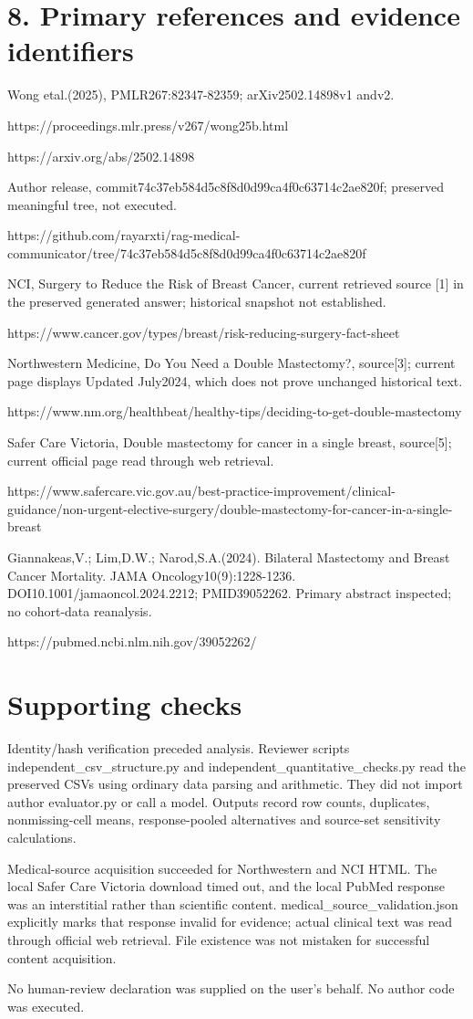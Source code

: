 \documentclass[10pt]{article}
\begin{document}
\section*{8. Primary references and evidence identifiers}
Wong etal.(2025), PMLR267:82347-82359; arXiv2502.14898v1 andv2.\par
https://proceedings.mlr.press/v267/wong25b.html\par
https://arxiv.org/abs/2502.14898\par
Author release, commit74c37eb584d5c8f8d0d99ca4f0c63714c2ae820f; preserved meaningful tree, not executed.\par
https://github.com/rayarxti/rag-medical-communicator/tree/74c37eb584d5c8f8d0d99ca4f0c63714c2ae820f\par
NCI, Surgery to Reduce the Risk of Breast Cancer, current retrieved source [1] in the preserved generated answer; historical snapshot not established.\par
https://www.cancer.gov/types/breast/risk-reducing-surgery-fact-sheet\par
Northwestern Medicine, Do You Need a Double Mastectomy?, source[3]; current page displays Updated July2024, which does not prove unchanged historical text.\par
https://www.nm.org/healthbeat/healthy-tips/deciding-to-get-double-mastectomy\par
Safer Care Victoria, Double mastectomy for cancer in a single breast, source[5]; current official page read through web retrieval.\par
https://www.safercare.vic.gov.au/best-practice-improvement/clinical-guidance/non-urgent-elective-surgery/double-mastectomy-for-cancer-in-a-single-breast\par
Giannakeas,V.; Lim,D.W.; Narod,S.A.(2024). Bilateral Mastectomy and Breast Cancer Mortality. JAMA Oncology10(9):1228-1236. DOI10.1001/jamaoncol.2024.2212; PMID39052262. Primary abstract inspected; no cohort-data reanalysis.\par
https://pubmed.ncbi.nlm.nih.gov/39052262/\par
\section*{Supporting checks}
Identity/hash verification preceded analysis. Reviewer scripts independent\_csv\_structure.py and independent\_quantitative\_checks.py read the preserved CSVs using ordinary data parsing and arithmetic. They did not import author evaluator.py or call a model. Outputs record row counts, duplicates, nonmissing-cell means, response-pooled alternatives and source-set sensitivity calculations.\par
Medical-source acquisition succeeded for Northwestern and NCI HTML. The local Safer Care Victoria download timed out, and the local PubMed response was an interstitial rather than scientific content. medical\_source\_validation.json explicitly marks that response invalid for evidence; actual clinical text was read through official web retrieval. File existence was not mistaken for successful content acquisition.\par
No human-review declaration was supplied on the user’s behalf. No author code was executed.\par
\end{document}
